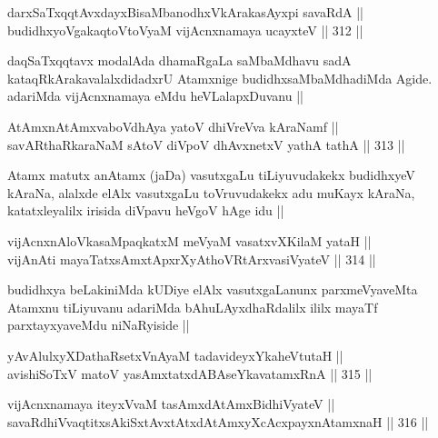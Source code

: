 \begin{shl}
darxSaTxqqtAvxdayxBisaMbanodhxV\s kArakasAyxpi savaRdA || \\
budidhxyoVgakaqtoV\s toV\s yaM vijAcnxnamaya ucayxteV ||  312 ||  
\end{shl}

\begin{artha}
daqSaTxqqtavx modalAda dhamaRgaLa saMbaMdhavu sadA kataqRkArakavalalxdidadxrU Atamxnige budidhxsaMbaMdhadiMda Agide. adariMda vijAcnxnamaya eMdu heVLalapxDuvanu ||
\end{artha}


\begin{shl}
AtAmxnAtAmxvaboVdhAya yatoV dhiVreVva kAraNamf || \\
savARthaRkaraNaM sA\s toV diVpoV dhAvxnetxV yathA tathA ||  313 ||  
\end{shl}

\begin{artha}
Atamx matutx anAtamx (jaDa) vasutxgaLu tiLiyuvudakekx budidhxyeV kAraNa, alalxde elAlx vasutxgaLu toVruvudakekx adu muKayx kAraNa, katatxleyalilx irisida diVpavu heVgoV hAge idu ||
\end{artha}


\begin{shl}
vijAcnxnAloVkasaMpaqkatxM meVyaM vasatxvXKilaM yataH || \\
vijAnAti mayaTatxsAmxtApxrXyAthoVR\s tArxvasiVyateV ||  314 ||  
\end{shl}

\begin{artha}
budidhxya beLakiniMda kUDiye elAlx vasutxgaLanunx parxmeVyaveMta Atamxnu tiLiyuvanu adariMda bAhuLAyxdhaRdalilx ililx mayaTf parxtayxyaveMdu niNaRyiside ||
\end{artha}

\begin{shl}
yAvAlulxyXDathaRsetxVnAyaM tadavideyxYkaheVtutaH || \\
avishiSoTxV matoV yasAmxtatxdABAseYkavatamxRnA ||  315 || 
\end{shl}
				
\begin{shl}
vijAcnxnamaya iteyxVvaM tasAmxdAtAmx\s BidhiVyateV || \\
savaRdhiVvaqtitxsAkiSxtAvxtAtxdAtAmxyXcAcxpayxnAtamxnaH ||  316 || 
\end{shl}

